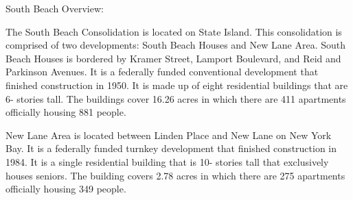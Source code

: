 South Beach Overview:      

    

The South Beach Consolidation is located on State Island. This consolidation is comprised of two developments: South Beach Houses and New Lane Area. South Beach Houses is bordered by Kramer Street, Lamport Boulevard, and Reid and Parkinson Avenues. It is a federally funded conventional development that finished construction in 1950. It is made up of eight residential buildings that are 6- stories tall. The buildings cover 16.26 acres in which there are 411 apartments officially housing 881 people.  

New Lane Area is located between Linden Place and New Lane on New York Bay. It is a federally funded turnkey development that finished construction in 1984. It is a single residential building that is 10- stories tall that exclusively houses seniors. The building covers 2.78 acres in which there are 275 apartments officially housing 349 people.  